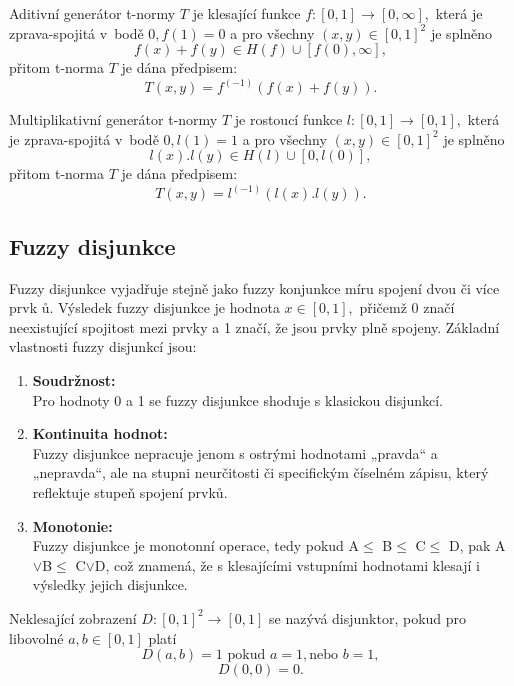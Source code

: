 \begin{definition}
    \cite{hlinena}
    Aditivní generátor t-normy $T$ je klesající funkce
    $f:[0,1] \rightarrow [0,\infty],$ která je zprava-spojitá v~bodě $0,
    f(1)=0$
    a pro všechny $(x,y) \in [0,1]^2$ je splněno
    $$f(x)+f(y) \in H(f) \cup [f(0),\infty],$$
    přitom t-norma $T$ je dána předpisem:
    $$T(x,y)=f^{(-1)}(f(x)+f(y)).$$
\end{definition}
\begin{definition}
    \cite{hlinena}
    Multiplikativní generátor t-normy $T$ je rostoucí funkce
    $l:[0,1] \rightarrow [0,1],$ která je zprava-spojitá v~bodě $0, l(1)=1$
    a pro všechny $(x,y) \in [0,1]^2$ je splněno
    $$l(x).l(y) \in H(l) \cup [0,l(0)],$$
    přitom t-norma $T$ je dána předpisem:
    $$T(x,y)=l^{(-1)}(l(x).l(y)).$$
\end{definition}

\subsection{Fuzzy disjunkce} 
Fuzzy disjunkce vyjadřuje stejně jako fuzzy konjunkce míru spojení dvou či více prvk \r u. Výsledek fuzzy disjunkce je hodnota $x \in [0,1],$ přičemž 0 značí neexistující spojitost mezi prvky a 1 značí, že jsou prvky plně spojeny.
Základní vlastnosti fuzzy disjunkcí jsou:
\begin{enumerate}
    \item \textbf{Soudržnost:}\\
    Pro hodnoty 0 a 1 se fuzzy disjunkce shoduje s klasickou disjunkcí.
    \item \textbf{Kontinuita hodnot:}\\
    Fuzzy disjunkce nepracuje jenom s  ostrými hodnotami „pravda“ a „nepravda“, ale na stupni neurčitosti či specifickým číselném zápisu, který reflektuje stupeň spojení prvk\r u.
   \item \textbf{Monotonie:}\\
    Fuzzy disjunkce je monotonní operace, tedy pokud A$\leq$ B$\leq$ C$\leq$ D, pak A$\lor$B$\leq$ C$\lor$D, což znamená, že s klesajícími vstupními hodnotami klesají i výsledky jejich disjunkce.
\end{enumerate}

\begin{definition}
    \cite{hlinena}
    Neklesající zobrazení $D: [0,1]^2 \rightarrow [0,1]$ se nazývá disjunktor, pokud pro libovolné $a, b \in [0,1]$ platí $$D(a,b) = 1  \text{ pokud }  a = 1, \text{nebo }  b = 1,$$
    $$D(0,0) = 0.$$
\end{definition}


